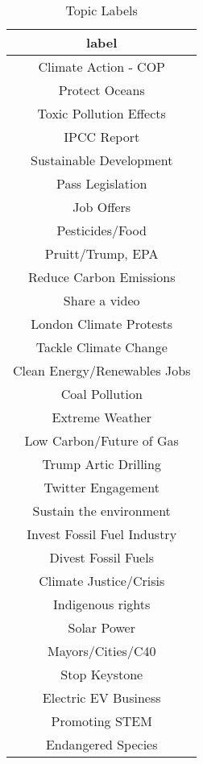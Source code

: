 \begin{table}[ht]
\centering
\caption{Topic Labels} 
\label{tab:TopicLabels}
\begin{tabular}{c}
  \hline
label \\ 
  \hline
Climate Action - COP \\ 
  Protect Oceans \\ 
  Toxic Pollution Effects \\ 
  IPCC Report \\ 
  Sustainable Development \\ 
  Pass Legislation \\ 
  Job Offers \\ 
  Pesticides/Food \\ 
  Pruitt/Trump, EPA \\ 
  Reduce Carbon Emissions \\ 
  Share a video \\ 
  London Climate Protests \\ 
  Tackle Climate Change \\ 
  Clean Energy/Renewables Jobs \\ 
  Coal Pollution \\ 
  Extreme Weather \\ 
  Low Carbon/Future of Gas \\ 
  Trump Artic Drilling \\ 
  Twitter Engagement \\ 
  Sustain the environment \\ 
  Invest Fossil Fuel Industry \\ 
  Divest Fossil Fuels \\ 
  Climate Justice/Crisis \\ 
  Indigenous rights \\ 
  Solar Power \\ 
  Mayors/Cities/C40 \\ 
  Stop Keystone \\ 
  Electric EV Business \\ 
  Promoting STEM \\ 
  Endangered Species \\ 
   \hline
\end{tabular}
\end{table}
